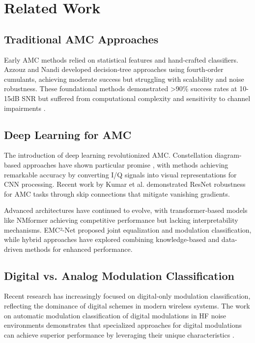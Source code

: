 \documentclass{ELSP}
\begin{document}
\section{Related Work}

\subsection{Traditional AMC Approaches}
Early AMC methods relied on statistical features and hand‑crafted classifiers. Azzouz and Nandi \cite{nandi1995cumulants,azzouz1995automatic} developed decision‑tree approaches using fourth‑order cumulants, achieving moderate success but struggling with scalability and noise robustness. These foundational methods demonstrated >90\% success rates at 10-15dB SNR but suffered from computational complexity and sensitivity to channel impairments \cite{proakis2008digital}.

\subsection{Deep Learning for AMC}
The introduction of deep learning revolutionized AMC. Constellation diagram-based approaches have shown particular promise \cite{doan2020learning,kumar2020automatic}, with methods achieving remarkable accuracy by converting I/Q signals into visual representations for CNN processing. Recent work by Kumar et al. \cite{kumar2023automatic} demonstrated ResNet robustness for AMC tasks through skip connections that mitigate vanishing gradients. 

Advanced architectures have continued to evolve, with transformer‑based models like NMformer \cite{kong2023transformer,faysal2024nmformer} achieving competitive performance but lacking interpretability mechanisms. EMC²-Net \cite{ryu2023emc} proposed joint equalization and modulation classification, while hybrid approaches \cite{zheng2023toward} have explored combining knowledge-based and data-driven methods for enhanced performance.

\subsection{Digital vs. Analog Modulation Classification}
Recent research has increasingly focused on digital‑only modulation classification, reflecting the dominance of digital schemes in modern wireless systems. The work on automatic modulation classification of digital modulations in HF noise environments demonstrates that specialized approaches for digital modulations can achieve superior performance by leveraging their unique characteristics \cite{peng2021survey}. 
\end{document}
